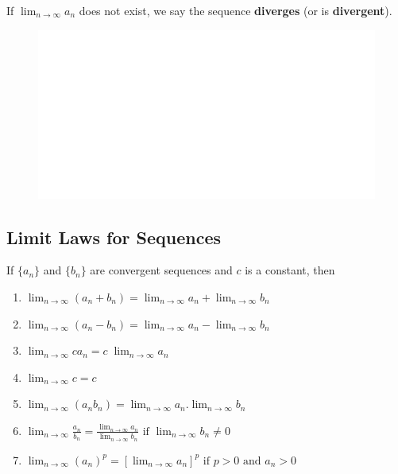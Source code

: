 \documentclass[]{book}
\begin{document}
If \(\lim_{n\rightarrow \infty}a_n\) does not exist, we say the sequence \textbf{diverges} (or is \textbf{divergent}).

\begin{figure}

{\centering \includegraphics[width=1\linewidth]{figure/boxC21-1} 

}

\end{figure}

\hypertarget{limit-laws-for-sequences}{%
\subsection{Limit Laws for Sequences}\label{limit-laws-for-sequences}}

If \(\{a_n\}\) and \(\{b_n\}\) are convergent sequences and \(c\) is a constant, then

\begin{enumerate}
\def\labelenumi{\alph{enumi})}
\item
  \(\lim_{n \to \infty}(a_n+ b_n)= \lim_{n \to \infty}a_n+ \lim_{n \to \infty}b_n\)
\item
  \(\lim_{n \to \infty}(a_n- b_n)= \lim_{n \to \infty}a_n- \lim_{n \to \infty}b_n\)
\item
  \(\lim_{n \to \infty}ca_n= c \;\lim_{n \to \infty}a_n\)
\item
  \(\lim_{n \to \infty}c= c\)
\item
  \(\lim_{n \to \infty}(a_nb_n)= \lim_{n \to \infty}a_n. \lim_{n \to \infty}b_n\)
\item
  \(\lim_{n \to \infty}\frac{a_n}{b_n}= \frac{\lim_{n \to \infty}a_n} {\lim_{n \to \infty}b_n} \text{ if } \lim_{n \to \infty}{b_n} \neq 0\)
\item
  \(\lim_{n \to \infty}(a_n)^p= [\lim_{n \to \infty}a_n]^p \text{ if } p>0 \text{ and } a_n>0\)
\end{enumerate}
\end{document}
